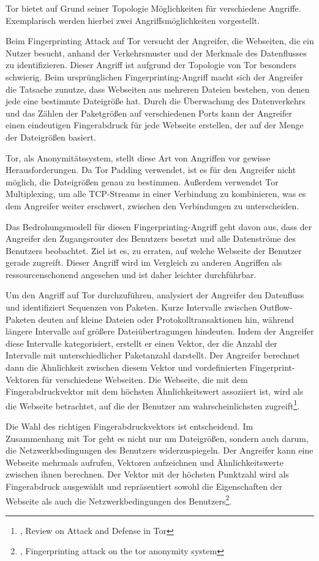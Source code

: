 Tor bietet auf Grund seiner Topologie Möglichkeiten für verschiedene Angriffe. Exemplarisch werden hierbei zwei Angriffsmöglichkeiten vorgestellt.

Beim Fingerprinting Attack auf Tor versucht der Angreifer, die Webseiten, die ein Nutzer besucht, anhand der Verkehrsmuster und der Merkmale des Datenflusses zu identifizieren. Dieser Angriff ist aufgrund der Topologie von Tor besonders schwierig. Beim ursprünglichen Fingerprinting-Angriff macht sich der Angreifer die Tatsache zunutze, dass Webseiten aus mehreren Dateien bestehen, von denen jede eine bestimmte Dateigröße hat. Durch die Überwachung des Datenverkehrs und das Zählen der Paketgrößen auf verschiedenen Ports kann der Angreifer einen eindeutigen Fingerabdruck für jede Webseite erstellen, der auf der Menge der Dateigrößen basiert.

Tor, als Anonymitätssystem, stellt diese Art von Angriffen vor gewisse Herausforderungen. Da Tor Padding verwendet, ist es für den Angreifer nicht möglich, die Dateigrößen genau zu bestimmen. Außerdem verwendet Tor Multiplexing, um alle TCP-Streams in einer Verbindung zu kombinieren, was es dem Angreifer weiter erschwert, zwischen den Verbindungen zu unterscheiden.

Das Bedrohungsmodell für diesen Fingerprinting-Angriff geht davon aus, dass der Angreifer den Zugangsrouter des Benutzers besetzt und alle Datenströme des Benutzers beobachtet. Ziel ist es, zu erraten, auf welche Webseite der Benutzer gerade zugreift. Dieser Angriff wird im Vergleich zu anderen Angriffen als ressourcenschonend angesehen und ist daher leichter durchführbar.

Um den Angriff auf Tor durchzuführen, analysiert der Angreifer den Datenfluss und identifiziert Sequenzen von Paketen. Kurze Intervalle zwischen Outflow-Paketen deuten auf kleine Dateien oder Protokolltransaktionen hin, während längere Intervalle auf größere Dateiübertragungen hindeuten. Indem der Angreifer diese Intervalle kategorisiert, erstellt er einen Vektor, der die Anzahl der Intervalle mit unterschiedlicher Paketanzahl darstellt. Der Angreifer berechnet dann die Ähnlichkeit zwischen diesem Vektor und vordefinierten Fingerprint-Vektoren für verschiedene Webseiten. Die Webseite, die mit dem Fingerabdruckvektor mit dem höchsten Ähnlichkeitswert assoziiert ist, wird als die Webseite betrachtet, auf die der Benutzer am wahrscheinlichsten zugreift\footnote{\cite{AttackInTor}, Review on Attack and Defense in Tor}.

Die Wahl des richtigen Fingerabdruckvektors ist entscheidend. Im Zusammenhang mit Tor geht es nicht nur um Dateigrößen, sondern auch darum, die Netzwerkbedingungen des Benutzers widerzuspiegeln. Der Angreifer kann eine Webseite mehrmals aufrufen, Vektoren aufzeichnen und Ähnlichkeitswerte zwischen ihnen berechnen. Der Vektor mit der höchsten Punktzahl wird als Fingerabdruck ausgewählt und repräsentiert sowohl die Eigenschaften der Webseite als auch die Netzwerkbedingungen des Benutzers\footnote{\cite{FingerprintingOnTorAttack}, Fingerprinting attack on the tor anonymity system}.

